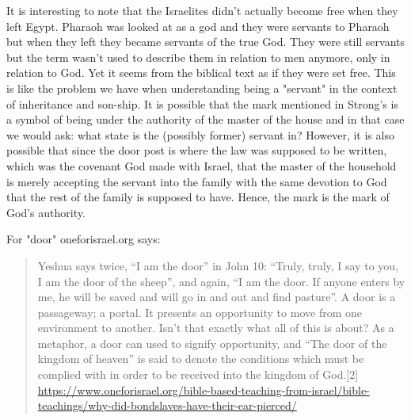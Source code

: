 \documentclass[11pt]{article}
\begin{document}
It is interesting to note that the Israelites didn't actually become free when they left Egypt. Pharaoh was looked at as a god and they were servants to Pharaoh but when they left they became servants of the true God. They were still servants but the term wasn't used to describe them in relation to men anymore, only in relation to God. Yet it seems from the biblical text as if they were set free. This is like the problem we have when understanding being a "servant" in the context of inheritance and son-ship. It is possible that the mark mentioned in Strong's is a symbol of being under the authority of the master of the house and in that case we would ask: what state is the (possibly former) servant in? However, it is also possible that since the door post is where the law was supposed to be written, which was the covenant God made with Israel, that the master of the household is merely accepting the servant into the family with the same devotion to God that the rest of the family is supposed to have. Hence, the mark is the mark of God's authority. \newline 

\noindent For "door" oneforisrael.org says:
\begin{quote}
Yeshua says twice, “I am the door” in John 10: “Truly, truly, I say to you, I am the door of the sheep”, and again, “I am the door. If anyone enters by me, he will be saved and will go in and out and find pasture”.
A door is a passageway; a portal. It presents an opportunity to move from one environment to another. Isn’t that exactly what all of this is about? As a metaphor, a door can used to signify opportunity, and “The door of the kingdom of heaven” is said to denote the conditions which must be complied with in order to be received into the kingdom of God.[2]
\url{https://www.oneforisrael.org/bible-based-teaching-from-israel/bible-teachings/why-did-bondslaves-have-their-ear-pierced/}
\end{quote}
\end{document}
